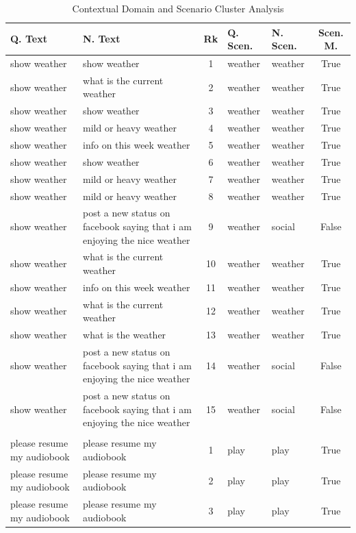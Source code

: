 {\small
\begin{longtable}{p{4.0cm} p{4.0cm} c ll c}
\caption{Contextual Domain and Scenario Cluster Analysis} \\
\toprule
\textbf{Q. Text} & \textbf{N. Text} & \textbf{Rk} & \textbf{Q. Scen.} & \textbf{N. Scen.} & \textbf{Scen. M.} \\
\midrule
show weather & show weather & 1 & weather & weather & True \\
show weather & what is the current weather & 2 & weather & weather & True \\
show weather & show weather & 3 & weather & weather & True \\
show weather & mild or heavy weather & 4 & weather & weather & True \\
show weather & info on this week weather & 5 & weather & weather & True \\
show weather & show weather & 6 & weather & weather & True \\
show weather & mild or heavy weather & 7 & weather & weather & True \\
show weather & mild or heavy weather & 8 & weather & weather & True \\
show weather & post a new status on facebook saying that i am enjoying the nice weather & 9 & weather & social & False \\
show weather & what is the current weather & 10 & weather & weather & True \\
show weather & info on this week weather & 11 & weather & weather & True \\
show weather & what is the current weather & 12 & weather & weather & True \\
show weather & what is the weather & 13 & weather & weather & True \\
show weather & post a new status on facebook saying that i am enjoying the nice weather & 14 & weather & social & False \\
show weather & post a new status on facebook saying that i am enjoying the nice weather & 15 & weather & social & False \\
\midrule
 &  &  &  &  & \\ %
\midrule
please resume my audiobook & please resume my audiobook & 1 & play & play & True \\
please resume my audiobook & please resume my audiobook & 2 & play & play & True \\
please resume my audiobook & please resume my audiobook & 3 & play & play & True \\

\end{longtable}}
